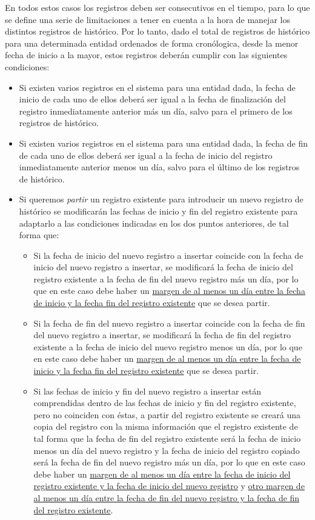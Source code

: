 En todos estos casos los registros deben ser consecutivos en el tiempo, para lo que se define una serie de limitaciones a tener en cuenta a la hora de manejar los distintos registros de histórico. Por lo tanto, dado el total de registros de histórico para una determinada entidad ordenados de forma cronólogica, desde la menor fecha de inicio a la mayor, estos registros deberán cumplir con las siguientes condiciones:
\begin{itemize}
\item Si existen varios registros en el sistema para una entidad dada, la fecha de inicio de cada uno de ellos deberá ser igual a la fecha  de finalización del registro inmediatamente anterior más un día, salvo para el primero de los registros de histórico.
	\item Si existen varios registros en el sistema para una entidad dada, la fecha de fin de cada uno de ellos deberá ser igual a la fecha  de inicio del registro inmediatamente anterior menos un día, salvo para el último de los registros de histórico.
	\item Si queremos \textit{partir} un registro existente para introducir un nuevo registro de histórico se modificarán las fechas de inicio y fin del registro existente para adaptarlo a las condiciones indicadas en los dos puntos anteriores, de tal forma que:
	\begin{itemize}
		\item Si la fecha de inicio del nuevo registro a insertar coincide con la fecha de inicio del nuevo registro a insertar, se modificará la fecha de inicio del registro existente a la fecha de fin del nuevo registro más un día, por lo que en este caso debe haber un \uline{margen de al menos un día entre la fecha de inicio y la fecha fin del registro existente} que se desea partir. 
		\item Si la fecha de fin del nuevo registro a insertar coincide con la fecha de fin del nuevo registro a insertar, se modificará la fecha de fin del registro existente a la fecha de inicio del nuevo registro menos un día, por lo que en este caso debe haber un \uline{margen de al menos un día entre la fecha de inicio y la fecha fin del registro existente} que se desea partir. 
		\item Si las fechas de inicio y fin del nuevo registro a insertar están comprendidas dentro de las fechas de inicio y fin del registro existente, pero no coinciden con éstas, a partir del registro existente se creará una copia del registro con la misma información que el registro existente de tal forma que la fecha de fin del registro existente será la fecha de inicio menos un día del nuevo registro y la fecha de inicio del registro copiado será la fecha de fin del nuevo registro más un día, por lo que en este caso debe haber un \uline{margen de al menos un día entre la fecha de inicio del registro existente y la fecha de inicio del nuevo registro} y  \uline{otro margen de al menos un día entre la fecha de fin del nuevo registro y la fecha de fin del registro existente}.

\end{itemize}
\end{itemize}
